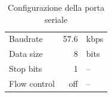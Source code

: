 \begin{table}[H] \centering
    \caption{Configurazione della porta seriale}
    \begin{tabular}{l r l}
        \toprule
        Baudrate & 57.6 & kbps \\
        Data size & 8 & bits \\
        Stop bits & 1 & -- \\
        Flow control & off & -- \\
        \bottomrule
    \end{tabular}
\end{table}


